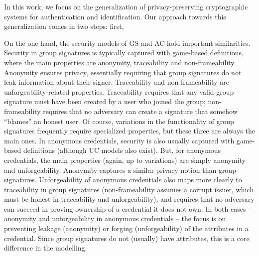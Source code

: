 In this work, we focus on the generalization of privacy-preserving cryptographic
systems for authentication and identification. Our approach towards this
generalization comes in two steps: first, 


On the one hand, the security models of GS and AC hold important similarities.
Security in group signatures is typically captured with game-based definitions,
where the main properties are anonymity, traceability and non-frameability.
Anonymity ensures privacy, essentially requiring that group signatures do not
leak information about their signer. Traceability and non-frameability are
unforgeability-related properties. Traceability requires that any valid group
signature must have been created by a user who joined the group;
non-frameability requires that no adversary can create a signature that somehow
``blames'' an honest user. Of course, variations in the functionality of group
signatures frequently require specialized properties, but these three are always
the main ones. In anonymous credentials, security is also usually captured with
game-based definitions (although UC models also exist). But, for anonymous
credentials, the main properties (again, up to variations) are simply anonymity
and unforgeability. Anonymity captures a similar privacy notion than group
signatures. Unforgeability of anonymous credentials also maps more clearly to
traceability in group signatures (non-frameability assumes a corrupt issuer,
which must be honest in traceability and unforgeability), and requires that
no adversary can succeed in proving ownership of a credential it does not own.
In both cases -- anonymity and unforgeability in anonymous credentials -- the
focus is on preventing leakage (anonymity) or forging (unforgeability) of the
attributes in a credential. Since group signatures do not (usually) have
attributes, this is a core difference in the modelling.

